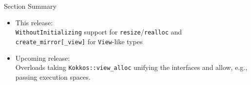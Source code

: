 
\begin{frame}{Section Summary}
  \begin{itemize}
    \item This release:\\ \texttt{WithoutInitializing} support for \texttt{resize}/\texttt{realloc} and \texttt{create\_mirror[\_view]} for \texttt{View}-like types
    \item Upcoming release: \\Overloads taking \texttt{Kokkos::view\_alloc} unifying the interfaces and allow, e.g., passing execution spaces.
  \end{itemize}
\end{frame}
